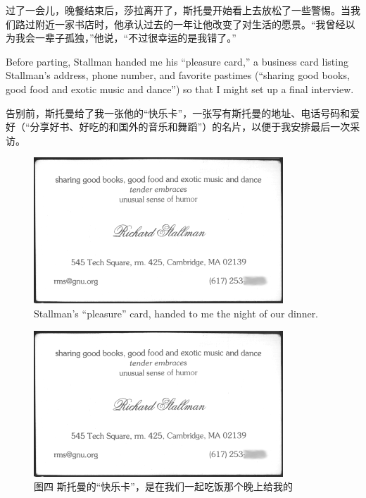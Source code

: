 \ifdefined\chs
过了一会儿，晚餐结束后，莎拉离开了，斯托曼开始看上去放松了一些警惕。当我们路过附近一家书店时，他承认过去的一年让他改变了对生活的愿景。``我曾经以为我会一辈子孤独，''他说，``不过很幸运的是我错了。''
\fi

\ifdefined\eng
Before parting, Stallman handed me his ``pleasure card,'' a business card listing Stallman's address, phone number, and favorite pastimes (``sharing good books, good food and exotic music and dance'') so that I might set up a final interview.
\fi

\ifdefined\chs
告别前，斯托曼给了我一张他的``快乐卡''，一张写有斯托曼的地址、电话号码和爱好（``分享好书、好吃的和国外的音乐和舞蹈''）的名片，以便于我安排最后一次采访。
\fi

\ifdefined\vone
\ifdefined\eng
\begin{figure}[ht] \centering
  \includegraphics[width=\textwidth]{pleasurecard}
  \caption{Stallman's ``pleasure'' card, handed to me the night of our dinner.}
\end{figure}
\fi

\ifdefined\chs
\begin{figure}[ht] \centering
  \includegraphics[width=\textwidth]{pleasurecard}
  \caption{图四 斯托曼的``快乐卡''，是在我们一起吃饭那个晚上给我的}
\end{figure}
\fi
\fi

